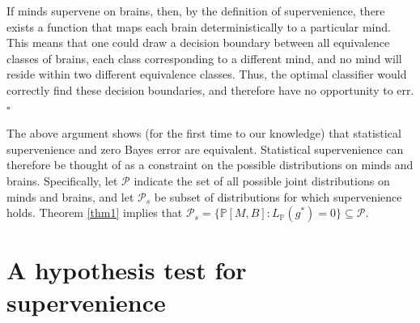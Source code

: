 \documentclass{article}
\newcommand{\PP}{\mathbb{P}}           %
\providecommand{\mc}[1]{\mathcal{#1}}
\begin{document}
\noindent If minds supervene on brains, then, by the definition of supervenience, there exists a function that maps each brain deterministically to a particular mind.  This means that one could draw a decision boundary between all equivalence classes of brains, each class corresponding to a different mind, and no mind will reside within two different equivalence classes.  Thus, the optimal classifier would correctly find these decision boundaries, and therefore have no opportunity to err. $\square$

The above argument shows (for the first time to our knowledge) that statistical supervenience and zero Bayes error are equivalent. Statistical supervenience can therefore be thought of as a constraint on the possible distributions on minds and brains.  Specifically, let $\mc{P}$ indicate the set of all possible joint distributions on minds and brains, and let $\mc{P}_s$ be subset of distributions for which supervenience holds. Theorem \ref{thm1} implies that $\mc{P}_s = \{\PP[M,B] : L_{\PP}(g^*)=0\} \subseteq \mc{P}$.


\section{A hypothesis test for supervenience} %
\label{sub:hypothesis_testing}
\end{document}
